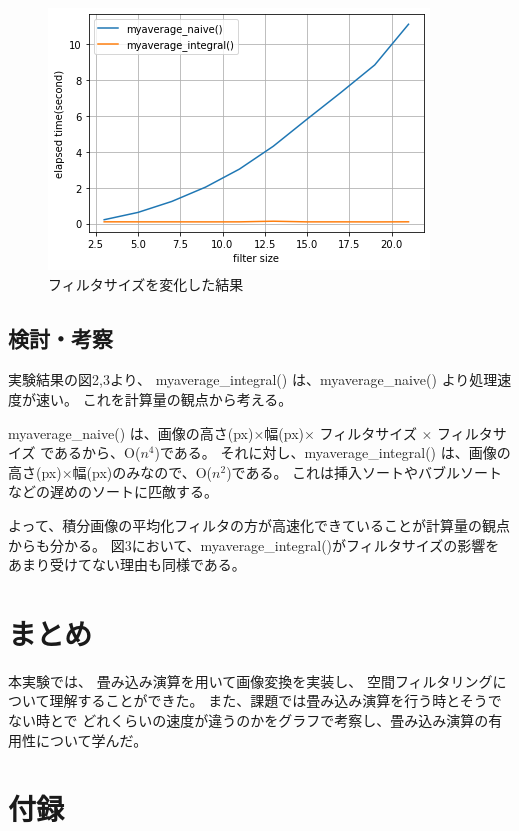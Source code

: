 \documentclass[12pt]{jarticle}
\begin{document}
\begin{figure}[h]
    \begin{center}
        \includegraphics[scale=0.7]{kadai4_2_2.png}
    \end{center}
    \caption{フィルタサイズを変化した結果}
\end{figure}

\clearpage
\subsection{検討・考察}
実験結果の図2,3より、
myaverage\_integral() は、myaverage\_naive() より処理速度が速い。
これを計算量の観点から考える。

myaverage\_naive() は、画像の高さ(px)$\times$幅(px)$\times$ フィルタサイズ $\times$ フィルタサイズ
であるから、O($n^4$)である。
それに対し、myaverage\_integral() は、画像の高さ(px)$\times$幅(px)のみなので、O($n^2$)である。
これは挿入ソートやバブルソートなどの遅めのソートに匹敵する。

よって、積分画像の平均化フィルタの方が高速化できていることが計算量の観点からも分かる。
図3において、myaverage\_integral()がフィルタサイズの影響をあまり受けてない理由も同様である。

\section{まとめ}
本実験では、
畳み込み演算を用いて画像変換を実装し、
空間フィルタリングについて理解することができた。
また、課題では畳み込み演算を行う時とそうでない時とで
どれくらいの速度が違うのかをグラフで考察し、畳み込み演算の有用性について学んだ。


\clearpage
\appendix
\section{付録}
\end{document}
